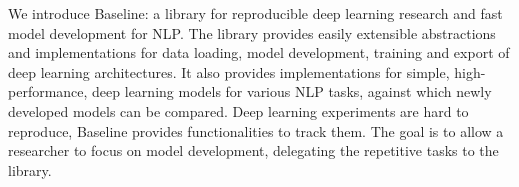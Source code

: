 We introduce Baseline: a library for reproducible deep learning research and fast model development for NLP. The library provides easily extensible abstractions and implementations for data loading, model development, training and export of deep learning architectures. It also provides implementations for simple, high-performance, deep learning models for various NLP tasks, against which newly developed models can be compared. Deep learning experiments are hard to reproduce, Baseline provides functionalities to track them. The goal is to allow a researcher to focus on model development, delegating the repetitive tasks to the library.
